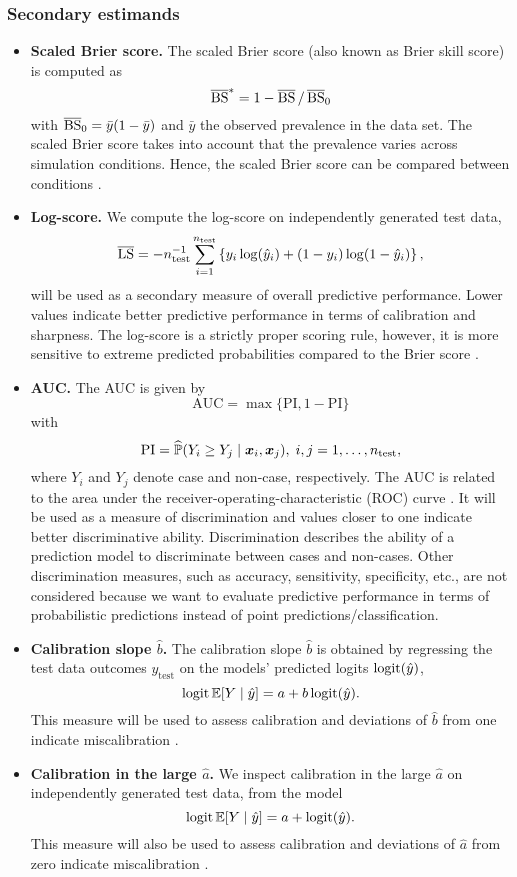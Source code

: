 \subsubsection{Secondary estimands}
\begin{itemize}
  \item \textbf{Scaled Brier score.} The scaled Brier score (also known as Brier skill score) is computed as
  $$\operatorname{\overline{BS}}^{*} = 1 - \operatorname{\overline{BS}}/\operatorname{\overline{BS}}_{0}$$
  with $\operatorname{\overline{BS}}_{0} = \bar{y}(1 - \bar{y})$ and $\bar{y}$ the observed prevalence in
  the data set. The scaled Brier score takes into account that the
  prevalence varies across simulation conditions. Hence, the scaled Brier score
  can be compared between conditions \citep{Schmid2005, steyerberg2019clinical}.

  \item \textbf{Log-score.} We compute the log-score on independently generated test data,
  $$\operatorname{\overline{LS}} = - n_{\text{test}}^{-1} \sum_{i=1}^{n_{\text{test}}} \left\{ y_{i} \log(\hat{y}_{i})
  + (1 - y_{i}) \log (1 - \hat{y}_{i})\right\},$$
  will be used as a secondary measure of overall predictive performance. Lower
  values indicate better predictive performance in terms of calibration and
  sharpness. The log-score is a strictly proper scoring rule, however, it is more
  sensitive to extreme predicted probabilities compared to the Brier score \citep{Gneiting2007}.
  
  \item \textbf{AUC.} The AUC is given by
  $$\text{AUC} = \max\{\text{PI}, 1 - \text{PI}\}$$
  with $$\text{PI} =  
  \widehat{\mathbb{P}}(Y_i \geq Y_j \mid \text{\boldmath$x$}_i, \text{\boldmath$x$}_j), \; i,j = 1, \dots, n_{\text{test}},$$
  where $Y_i$ and $Y_j$ denote case and non-case, respectively. The AUC is related
  to the area under the receiver-operating-characteristic (ROC) curve \citep{steyerberg2019clinical}.
  It will be used as a measure of discrimination and values closer to one
  indicate better discriminative ability. Discrimination describes the ability
  of a prediction model to discriminate between cases and non-cases.
  Other discrimination measures, such as accuracy, sensitivity, specificity, etc.,
  are not considered because we want to evaluate predictive performance
  in terms of probabilistic predictions instead of point predictions/classification.

  \item \textbf{Calibration slope $\hat b$.}  
  The calibration slope $\hat b$ is obtained by regressing
  the test data outcomes $y_{\text{test}}$ on the models' predicted logits $\operatorname{logit}({\hat{y}})$,
  \ie
  $$\operatorname{logit}\mathbb{E}[Y \mid \hat{y}] = a + b\operatorname{logit}(\hat{y}).$$
  This measure will be used to assess calibration and deviations of $\hat b$ from
  one indicate miscalibration \citep{steyerberg2019clinical}.

  \item \textbf{Calibration in the large $\hat a$.} We inspect calibration in the
  large $\hat a$ on independently generated test data, from the model
  $$\operatorname{logit}\mathbb{E}[Y \mid \hat{y}] = a + \operatorname{logit}(\hat{y}).$$
  This measure will also be used to assess calibration and deviations of $\hat a$ from
  zero indicate miscalibration \citep{steyerberg2019clinical}.
\end{itemize}

